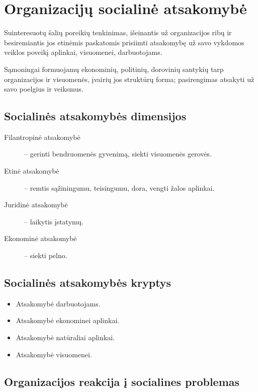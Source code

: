\chapter{Organizacijų socialinė atsakomybė}

\begin{defn}
  Suinteresuotų šalių poreikių tenkinimas, išeinantis už organizacijos
  ribų ir besiremiantis jos etinėmis paskatomis prisiimti atsakomybę
  už savo vykdomos veiklos poveikį aplinkai, visuomenei, darbuotojams.
\end{defn}

\begin{defn}
  Sąmoningai formuojamų ekonominių, politinių, dorovinių santykių
  tarp organizacijos ir visuomenės, įvairių jos struktūrų forma;
  pasirengimas atsakyti už savo poelgius ir veiksmus.
\end{defn}

\section{Socialinės atsakomybės dimensijos}

\begin{description}
  \item[Filantropinė atsakomybė] – gerinti bendruomenės gyvenimą, siekti
    visuomenės gerovės.
  \item[Etinė atsakomybė] – remtis sąžiningumu, teisingumu, dora, vengti
    žalos aplinkai.
  \item[Juridinė atsakomybė] – laikytis įstatymų.
  \item[Ekonominė atsakomybė] – siekti pelno.
\end{description}

\section{Socialinės atsakomybės kryptys}

\begin{itemize}
  \item Atsakomybė darbuotojams.
  \item Atsakomybė ekonominei aplinkai.
  \item Atsakomybė natūraliai aplinkai.
  \item Atsakomybė visuomenei.
\end{itemize}

\section{Organizacijos reakcija į socialines problemas}

